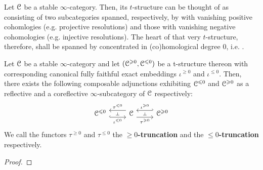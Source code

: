        \begin{remark}
            Let $\mathcal{C}$ be a stable $\infty$-category. Then, its $t$-structure can be thought of as consisting of two subcategories spanned, respectively, by  with vanishing positive cohomlogies (e.g. projective resolutions) and those with vanishing negative cohomologies (e.g. injective resolutions). The heart of that very $t$-structure, therefore, shall be spanned by  concentrated in (co)homological degree $0$, i.e. . 
        \end{remark}
        
        \begin{proposition} \label{prop: t_structures_and_localisations}
            Let $\mathcal{C}$ be a stable $\infty$-category and let $(\mathcal{C}^{\geqslant 0}, \mathcal{C}^{\leqslant 0})$ be a t-structure thereon with corresponding canonical fully faithful exact embeddings $\iota^{\geq 0}$ and $\iota^{\leq 0}$. Then, there exists the following composable adjunctions exhibiting $\mathcal{C}^{\leqslant 0}$ and $\mathcal{C}^{\geqslant 0}$ as a reflective and a coreflective $\infty$-subcategory of $\mathcal{C}$ respectively:
                $$
                    \begin{tikzcd}
                        {\C^{\leq 0}} & \C & {\C^{\geq 0}}
                        \arrow[""{name=0, anchor=center, inner sep=0}, "{\iota^{\leq 0}}"', shift right=2, hook, from=1-1, to=1-2]
                        \arrow[""{name=1, anchor=center, inner sep=0}, "{\tau^{\leq 0}}"', shift right=2, from=1-2, to=1-1]
                        \arrow[""{name=2, anchor=center, inner sep=0}, "{\tau^{\geq 0}}"', shift right=2, from=1-2, to=1-3]
                        \arrow[""{name=3, anchor=center, inner sep=0}, "{\iota^{\geq 0}}"', shift right=2, hook', from=1-3, to=1-2]
                        \arrow["\dashv"{anchor=center, rotate=-90}, draw=none, from=1, to=0]
                        \arrow["\dashv"{anchor=center, rotate=-90}, draw=none, from=3, to=2]
                    \end{tikzcd}
                $$
            We call the functors $\tau^{\geq 0}$ and $\tau^{\leq 0}$ the \textbf{$\geq 0$-truncation} and the \textbf{$\leq 0$-truncation} respectively.
        \end{proposition}
            \begin{proof}
                
            \end{proof}
